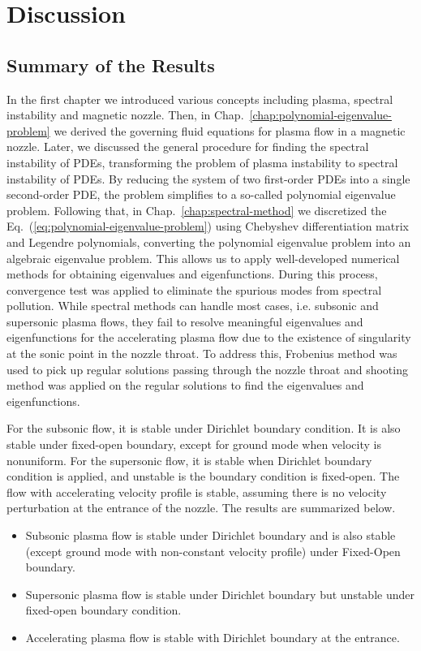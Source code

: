 \chapter{Discussion} \label{chap:discussion}
\section{Summary of the Results}
In the first chapter we introduced various concepts including plasma, spectral instability and magnetic nozzle. Then, in Chap.~\ref{chap:polynomial-eigenvalue-problem} we derived the governing fluid equations for plasma flow in a magnetic nozzle. Later, we discussed the general procedure for finding the spectral instability of PDEs, transforming the problem of plasma instability to spectral instability of PDEs. By reducing the system of two first-order PDEs into a single second-order PDE, the problem simplifies to a so-called polynomial eigenvalue problem. Following that, in Chap.~\ref{chap:spectral-method} we discretized the Eq.~(\ref{eq:polynomial-eigenvalue-problem}) using Chebyshev differentiation matrix and Legendre polynomials, converting the polynomial eigenvalue problem into an algebraic eigenvalue problem. This allows us to apply well-developed numerical methods for obtaining eigenvalues and eigenfunctions. During this process, convergence test was applied to eliminate the spurious modes from spectral pollution. While spectral methods can handle most cases, i.e. subsonic and supersonic plasma flows, they fail to resolve meaningful eigenvalues and eigenfunctions for the accelerating plasma flow due to the existence of singularity at the sonic point in the nozzle throat. To address this, Frobenius method was used to pick up regular solutions passing through the nozzle throat and shooting method was applied on the regular solutions to find the eigenvalues and eigenfunctions.

For the subsonic flow, it is stable under Dirichlet boundary condition. It is also stable under fixed-open boundary, except for ground mode when velocity is nonuniform. For the supersonic flow, it is stable when Dirichlet boundary condition is applied, and unstable is the boundary condition is fixed-open. The flow with accelerating velocity profile is stable, assuming there is no velocity perturbation at the entrance of the nozzle. The results are summarized below.

\begin{itemize}
	\item Subsonic plasma flow is stable under Dirichlet boundary and is also stable (except ground mode with non-constant velocity profile) under Fixed-Open boundary.
	\item Supersonic plasma flow is stable under Dirichlet boundary but unstable under fixed-open boundary condition.
	\item Accelerating plasma flow is stable with Dirichlet boundary at the entrance.
\end{itemize}

